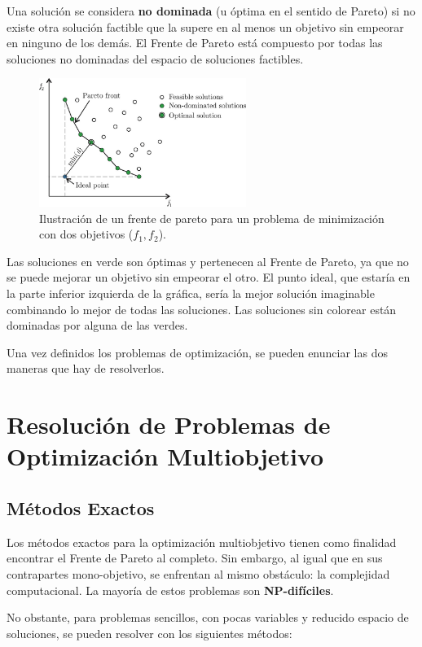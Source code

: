 \documentclass[12pt,a4paper]{book}
\begin{document}
Una solución se considera \textbf{no dominada} (u óptima en el sentido de Pareto) si no existe otra solución factible que la supere en al menos un objetivo sin empeorar en ninguno de los demás. El Frente de Pareto está compuesto por todas las soluciones no dominadas del espacio de soluciones factibles.
\begin{figure}[H]
    \centering
    \includegraphics[width=0.6\textwidth]{images/pareto_front.png}
    \caption{\cite{Bre2017} Ilustración de un frente de pareto para un problema de minimización con dos objetivos ($f_1, f_2$).}
    \label{fig:pareto}
\end{figure}
Las soluciones en verde son óptimas y pertenecen al Frente de Pareto, ya que no se puede mejorar un objetivo sin empeorar el otro. El punto ideal, que estaría en la parte inferior izquierda de la gráfica, sería la mejor solución imaginable combinando lo mejor de todas las soluciones. Las soluciones sin colorear están dominadas por alguna de las verdes.

Una vez definidos los problemas de optimización, se pueden enunciar las dos maneras que hay de resolverlos.

\section{Resolución de Problemas de Optimización Multiobjetivo}

\subsection{Métodos Exactos}

Los métodos exactos para la optimización multiobjetivo tienen como finalidad encontrar el Frente de Pareto al completo. Sin embargo, al igual que en sus contrapartes mono-objetivo, se enfrentan al mismo obstáculo: la complejidad computacional. La mayoría de estos problemas son \textbf{NP-difíciles}.

No obstante, para problemas sencillos, con pocas variables y reducido espacio de soluciones, se pueden resolver con los siguientes métodos:
\end{document}
